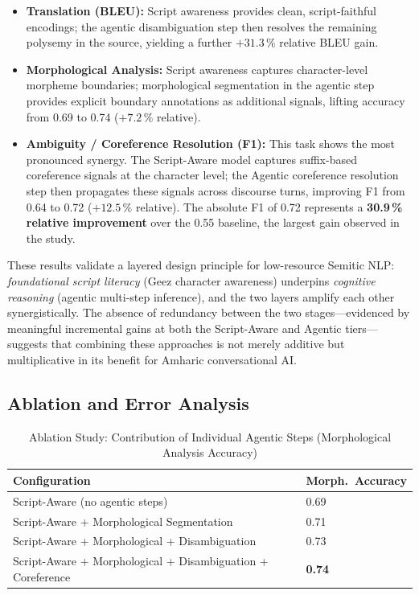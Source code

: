 \begin{itemize}
  \item \textbf{Translation (BLEU):} Script awareness provides clean, script-faithful encodings;
        the agentic disambiguation step then resolves the remaining polysemy in the source,
        yielding a further $+31.3\,\%$ relative BLEU gain.
  \item \textbf{Morphological Analysis:} Script awareness captures character-level morpheme
        boundaries; morphological segmentation in the agentic step provides explicit boundary
        annotations as additional signals, lifting accuracy from 0.69 to 0.74
        ($+7.2\,\%$ relative).
  \item \textbf{Ambiguity / Coreference Resolution (F1):} This task shows the most pronounced
        synergy.  The Script-Aware model captures suffix-based coreference signals at the
        character level; the Agentic coreference resolution step then propagates these signals
        across discourse turns, improving F1 from 0.64 to 0.72 ($+12.5\,\%$ relative).  The
        absolute F1 of 0.72 represents a \textbf{30.9\,\% relative improvement} over the
        0.55 baseline, the largest gain observed in the study.
\end{itemize}

These results validate a layered design principle for low-resource Semitic NLP: \emph{foundational
script literacy} (Ge\textquotesingle ez character awareness) underpins \emph{cognitive reasoning}
(agentic multi-step inference), and the two layers amplify each other synergistically.  The
absence of redundancy between the two stages---evidenced by meaningful incremental gains at both
the Script-Aware and Agentic tiers---suggests that combining these approaches is not merely
additive but multiplicative in its benefit for Amharic conversational AI.

\subsection{Ablation and Error Analysis}
\label{sec:ablation}

\begin{table}[htbp]
  \centering
  \caption{Ablation Study: Contribution of Individual Agentic Steps (Morphological Analysis Accuracy)}
  \label{tab:ablation}
  \begin{tabularx}{\columnwidth}{lX}
    \toprule
    \textbf{Configuration}                                     & \textbf{Morph.\ Accuracy} \\
    \midrule
    Script-Aware (no agentic steps)                            & 0.69 \\
    Script-Aware + Morphological Segmentation                  & 0.71 \\
    Script-Aware + Morphological + Disambiguation              & 0.73 \\
    Script-Aware + Morphological + Disambiguation + Coreference & \textbf{0.74} \\
    \bottomrule
  \end{tabularx}
\end{table}

